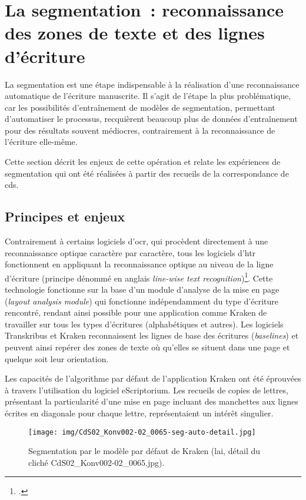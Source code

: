 \documentclass[a4paper,12pt,twoside]{book}
\begin{document}
		\section[La segmentation]{La segmentation~: reconnaissance des zones de texte et des lignes d'écriture}
			\label{lieu-segmentation}
			
			La segmentation est une étape indispensable à la réalisation d'une reconnaissance automatique de l'écriture manuscrite. Il s'agit de l'étape la plus problématique, car les possibilités d'entraînement de modèles de segmentation, permettant d'automatiser le processus, recquièrent beaucoup plus de données d'entraînement pour des résultats souvent médiocres, contrairement à la reconnaissance de l'écriture elle-même.
			
			Cette section décrit les enjeux de cette opération et relate les expériences de segmentation qui ont été réalisées à partir des recueils de la correspondance de \gls{cds}.
						
			\subsection{Principes et enjeux}
				Contrairement à certains logiciels d'\gls{ocr}, qui procèdent directement à une reconnaissance optique caractère par caractère, tous les logiciels d'\gls{htr} fonctionnent en appliquant la reconnaissance optique au niveau de la ligne d'écriture (principe dénommé en anglais \textit{line-wise text recognition})\footcite{stokesEScriptoriumVREManuscript2021}. Cette technologie fonctionne sur la base d'un module d'analyse de la mise en page (\textit{layout analysis module}) qui fonctionne indépendamment du type d'écriture rencontré, rendant ainsi possible pour une application comme Kraken de travailler sur tous les types d'écritures (alphabétiques et autres). Les logiciels Transkribus et Kraken reconnaissent les lignes de base des écritures (\textit{baselines}) et peuvent ainsi repérer des zones de texte où qu'elles se situent dans une page et quelque soit leur orientation. 
				
				Les capacités de l'algorithme par défaut de l'application Kraken ont été éprouvées à travers l'utilisation du logiciel eScriptorium. Les recueils de copies de lettres, présentant la particularité d'une mise en page incluant des manchettes aux lignes écrites en diagonale pour chaque lettre, représentaient un intérêt singulier.
				
				\begin{figure}[!h]
					\centering
					\texttt{[image: img/CdS02\_Konv002-02\_0065-seg-auto-detail.jpg]}
					\caption{Segmentation par le modèle par défaut de Kraken (\gls{lai}, détail du cliché CdS02\_Konv002-02\_0065.jpg).}
					\label{seg-defaut-65}
				\end{figure}
			
\end{document}
